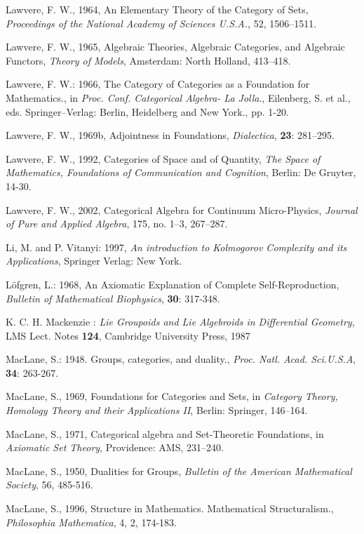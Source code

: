 \documentclass[12pt]{article}
\theoremstyle{plain}
\theoremstyle{definition}
\numberwithin{equation}{section}
\begin{document}
\begin{thebibliography}{99}
Lawvere, F. W., 1964, An Elementary Theory of the Category of Sets, {\em Proceedings of the National Academy of Sciences U.S.A.}, 52, 1506--1511.

Lawvere, F. W., 1965, Algebraic Theories, Algebraic Categories, and Algebraic Functors, {\em Theory of Models}, Amsterdam: North Holland, 413--418.

Lawvere, F. W.: 1966, The Category of Categories as a Foundation for Mathematics., in \emph{Proc. Conf. Categorical Algebra- La Jolla}., Eilenberg, S. et al., eds. Springer--Verlag: Berlin, Heidelberg and New York., pp. 1-20.

Lawvere, F. W., 1969b, Adjointness in Foundations, {\em Dialectica}, \textbf{23}: 281--295.

Lawvere, F. W., 1992, Categories of Space and of Quantity, {\em The Space of Mathematics, Foundations of Communication and Cognition}, Berlin: De Gruyter, 14-30.

Lawvere, F. W., 2002, Categorical Algebra for Continuum Micro-Physics, {\em Journal of Pure and Applied Algebra}, 175, no. 1--3, 267--287.

Li, M. and P. Vitanyi: 1997, \emph{An introduction to Kolmogorov Complexity and its Applications}, Springer Verlag: New York.

L\"{o}fgren, L.: 1968, An Axiomatic Explanation of Complete Self-Reproduction, \emph{Bulletin of Mathematical Biophysics}, \textbf{30}: 317-348.

K. C. H. Mackenzie : {\em Lie Groupoids and Lie Algebroids in Differential Geometry}, LMS Lect. Notes \textbf{124}, Cambridge University Press, 1987

MacLane, S.: 1948. Groups, categories, and duality., {\em Proc. Natl. Acad. Sci.U.S.A}, \textbf{34}: 263-267.

MacLane, S., 1969, Foundations for Categories and Sets, in {\em Category Theory, Homology Theory and their Applications II}, Berlin: Springer, 146--164.

MacLane, S., 1971, Categorical algebra and Set-Theoretic Foundations, in {\em Axiomatic Set Theory}, Providence: AMS, 231--240.

MacLane, S., 1950, Dualities for Groups, {\em Bulletin of the American Mathematical Society}, 56, 485-516.

MacLane, S., 1996, Structure in Mathematics. Mathematical Structuralism., {\em Philosophia Mathematica}, 4, 2, 174-183.


\end{thebibliography}
\end{document}
